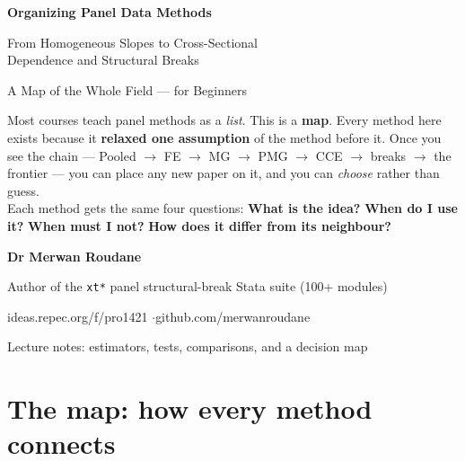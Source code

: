 \documentclass[11pt,a4paper]{article}
\newcommand{\hlt}[2]{\textcolor{#1}{\textbf{#2}}}
\begin{document}
\begin{titlepage}\thispagestyle{empty}\centering
\vspace*{1.4cm}
{\color{cblue}\Huge\bfseries Organizing Panel Data Methods\par}
\vspace{0.4cm}{\color{corange}\rule{0.55\linewidth}{2pt}}\par\vspace{0.4cm}
{\color{cink}\LARGE From Homogeneous Slopes to Cross-Sectional\\[4pt] Dependence and Structural Breaks\par}
\vspace{0.5cm}
{\color{cteal}\large A Map of the Whole Field --- for Beginners\par}
\vspace{1.2cm}

\begin{tcolorbox}[width=0.86\linewidth,colback=cblue!5,colframe=cblue,arc=6pt,
  title={\bfseries The purpose of these notes},coltitle=white,fonttitle=\bfseries]
Most courses teach panel methods as a \emph{list}. This is a \textbf{map}. Every method here
exists because it \textbf{relaxed one assumption} of the method before it. Once you see the chain
--- Pooled $\to$ FE $\to$ MG $\to$ PMG $\to$ CCE $\to$ breaks $\to$ the frontier --- you can place
any new paper on it, and you can \emph{choose} rather than guess.\\[4pt]
Each method gets the same four questions: \hlt{cblue}{What is the idea?}
\hlt{cgreen}{When do I use it?} \hlt{cred}{When must I not?}
\hlt{camber}{How does it differ from its neighbour?}
\end{tcolorbox}

\vspace{1.2cm}
{\large\bfseries\color{cgrape} Dr Merwan Roudane\par}
{\color{cgray} Author of the \texttt{xt*} panel structural-break Stata suite (100+ modules)\par}
{\color{cgray}\small ideas.repec.org/f/pro1421 \quad$\cdot$\quad github.com/merwanroudane\par}
\vfill
{\color{cgray}\small Lecture notes: estimators, tests, comparisons, and a decision map}
\end{titlepage}

\tableofcontents
\newpage

\section{The map: how every method connects}
\end{document}
